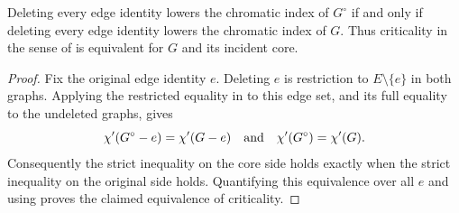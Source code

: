 \begin{lemma}
Deleting every edge identity lowers the chromatic index of $G^{\circ}$ if
and only if deleting every edge identity lowers the chromatic index of $G$.
Thus criticality in the sense of  is equivalent for $G$
and its incident core.
\end{lemma}
\begin{proof}
Fix the original edge identity $e$.  Deleting $e$ is restriction to
$E\setminus\{e\}$ in both graphs.  Applying the
restricted equality in  to this edge
set, and its full equality to the undeleted graphs, gives
\[
 \chi'(G^{\circ}-e)=\chi'(G-e)
 \quad\hbox{and}\quad
 \chi'(G^{\circ})=\chi'(G).
\]
Consequently the strict inequality on the core side holds exactly when the
strict inequality on the original side holds.  Quantifying this equivalence
over all $e$ and using  proves the claimed equivalence of
criticality.
\end{proof}
